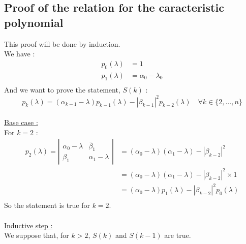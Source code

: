 \documentclass[1pt, a4paper]{article}
\begin{document}
\subsection{Proof of the relation for the caracteristic polynomial}
\label{app:pol}
This proof will be done by induction.\\
We have :
\begin{equation}
    \begin{aligned}
        p_0(\lambda) &= 1\\
        p_1(\lambda) &= \alpha_0-\lambda_0\\
    \end{aligned}
\end{equation}
And we want to prove the statement, $S(k)$ :
\begin{equation}
    p_k(\lambda) = (\alpha_{k-1}-\lambda)p_{k-1}(\lambda)-|\beta_{k-1}|^2p_{k-2}(\lambda)\quad\forall k\in\{2,\hdots,n\}
\end{equation}
\\
\underline{Base case :}\\
For $k=2$ :
\begin{equation}
    \begin{aligned}
            p_2(\lambda) = \left|\begin{matrix}
                                \alpha_0 - \lambda & \bar{\beta}_1\\
                                \beta_1 & \alpha_1 - \lambda
                            \end{matrix}\right| &= (\alpha_0-\lambda)(\alpha_1-\lambda) - |\beta_{k-2}|^2\\
                                                &= (\alpha_0-\lambda)(\alpha_1-\lambda) - |\beta_{k-2}|^2\times 1\\
                                                &= (\alpha_0-\lambda)p_1(\lambda) - |\beta_{k-2}|^2p_0(\lambda)\\
    \end{aligned}
\end{equation}
So the statement is true for $k=2$.\\
\\
\underline{Inductive step :}\\
We suppose that, for $k>2$, $S(k)$ and $S(k-1)$ are true.
\end{document}
